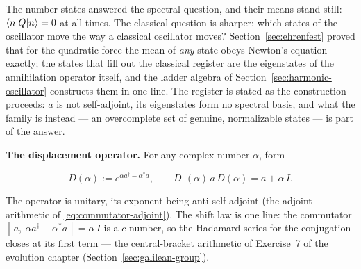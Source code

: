 The number states answered the spectral question, and their means stand still: $\braket{n|Q|n} = 0$ at all times. The classical question is sharper: which states of the oscillator move the way a classical oscillator moves? Section~\ref{sec:ehrenfest} proved that for the quadratic force the mean of \emph{any} state obeys Newton's equation exactly; the states that fill out the classical register are the eigenstates of the annihilation operator itself, and the ladder algebra of Section~\ref{sec:harmonic-oscillator} constructs them in one line. The register is stated as the construction proceeds: $a$ is not self-adjoint, its eigenstates form no spectral basis, and what the family is instead --- an overcomplete set of genuine, normalizable states --- is part of the answer.

\textbf{The displacement operator.} For any complex number $\alpha$, form
\begin{linenomath}
    \begin{equation}
        D(\alpha) := e^{\alpha a^\dagger - \alpha^{*} a},
        \qquad
        D^\dagger(\alpha)\,a\,D(\alpha) = a + \alpha\,I.
        \label{eq:displacement-operator}
    \end{equation}
\end{linenomath}
The operator is unitary, its exponent being anti-self-adjoint (the adjoint arithmetic of \eqref{eq:commutator-adjoint}). The shift law is one line: the commutator $[\,a,\ \alpha a^\dagger - \alpha^{*}a\,] = \alpha\,I$ is a $c$-number, so the Hadamard series for the conjugation closes at its first term --- the central-bracket arithmetic of Exercise~7 of the evolution chapter (Section~\ref{sec:galilean-group}).


